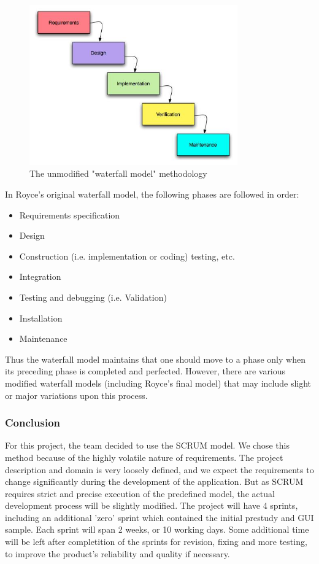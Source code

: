 \begin{figure}[htb]
	\centering
	\includegraphics[width=0.8\textwidth]{process/development_process/waterfall.jpg}
	\caption{The unmodified "waterfall model" methodology\cite{worldpress:waterfall}}
	\label{fig:waterfall-model}
\end{figure}

In Royce's original waterfall model, the following phases are followed in order:

\begin{itemize}
	\item Requirements specification
	\item Design
	\item Construction (i.e. implementation or coding) testing, etc.
	\item Integration
	\item Testing and debugging (i.e. Validation)
	\item Installation
	\item Maintenance
\end{itemize}

Thus the waterfall model maintains that one should move to a phase only when its preceding phase is
completed and perfected. However, there are various modified waterfall models (including Royce's final model)
that may include slight or major variations upon this process.

\subsubsection{Conclusion}
For this project, the team decided to use the SCRUM model. We chose this method because of the highly volatile nature
of requirements. The project description and domain is very loosely defined,
and we expect the requirements to change significantly during the development
of the application. But as SCRUM requires strict and precise
execution of the predefined model, the actual development process will be slightly modified.
The project will have 4 sprints, including an additional 'zero' sprint which contained the initial
prestudy and GUI sample. Each sprint will span 2 weeks, or 10 working days.
Some additional time will be left after completition of the sprints for revision,
fixing and more testing, to improve the product's reliability and quality if necessary.

